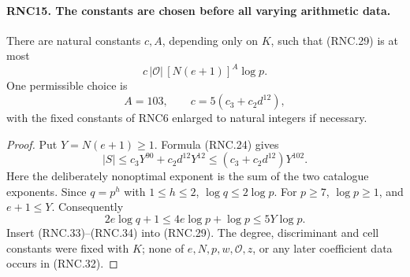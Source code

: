 \paragraph{RNC15. The constants are chosen before all varying arithmetic data.}
\label{claim:RNC15}
There are natural constants $c,A$, depending only on $K$,
such that (RNC.29) is at most
\[
                c\,|\mathcal O|\,[N(e+1)]^A\log p.
                                                               \tag{RNC.31}
\]
One permissible choice is
\[
             A=103,\qquad c=5(c_3+c_2d^{12}),                 \tag{RNC.32}
\]
with the fixed constants of RNC6 enlarged to natural
integers if necessary.
\begin{proof}
Put $Y=N(e+1)\geq1$.  Formula (RNC.24) gives
\[
 |S|\leq c_3Y^{90}+c_2d^{12}Y^{12}
                    \leq(c_3+c_2d^{12})Y^{102}.               \tag{RNC.33}
\]
Here the deliberately nonoptimal exponent is the sum
of the two catalogue exponents.  Since $q=p^h$ with
$1\leq h\leq2$, $\log q\leq2\log p$.  For $p\geq7$,
$\log p\geq1$, and $e+1\leq Y$.  Consequently
\[
 2e\log q+1\leq4e\log p+\log p
                         \leq5Y\log p.                       \tag{RNC.34}
\]
Insert (RNC.33)--(RNC.34) into (RNC.29).  The degree,
discriminant and cell constants were fixed with $K$;
none of $e,N,p,w,\mathcal O,z$, or any later coefficient
data occurs in (RNC.32).
\end{proof}

